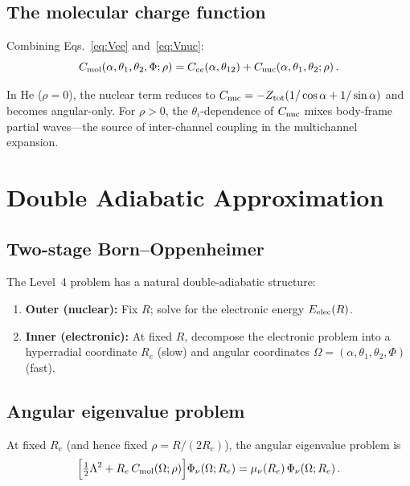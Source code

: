 \documentclass[aps,pra,twocolumn,superscriptaddress,longbibliography]{revtex4-2}
\begin{document}
\subsection{The molecular charge function}

Combining Eqs.~\eqref{eq:Vee} and~\eqref{eq:Vnuc}:
\begin{equation}
  C_{\rm mol}(\alpha,\theta_1,\theta_2,\Phi;\rho)
    = C_{ee}(\alpha,\theta_{12})
    + C_{\rm nuc}(\alpha,\theta_1,\theta_2;\rho)\,.
  \label{eq:Cmol}
\end{equation}

In He ($\rho=0$), the nuclear term reduces to
$C_{\rm nuc} = -Z_{\rm tot}(1/\cos\alpha + 1/\sin\alpha)$
and becomes angular-only.  For $\rho > 0$, the $\theta_i$-dependence
of $C_{\rm nuc}$ mixes body-frame partial waves---the source of
inter-channel coupling in the multichannel expansion.

\section{Double Adiabatic Approximation}
\label{sec:adiabatic}

\subsection{Two-stage Born--Oppenheimer}

The Level~4 problem has a natural double-adiabatic structure:
\begin{enumerate}
  \item \textbf{Outer (nuclear):} Fix $R$; solve for the electronic
    energy $E_{\rm elec}(R)$.
  \item \textbf{Inner (electronic):} At fixed $R$, decompose the
    electronic problem into a hyperradial coordinate $R_e$ (slow) and
    angular coordinates $\Omega = (\alpha,\theta_1,\theta_2,\Phi)$ (fast).
\end{enumerate}

\subsection{Angular eigenvalue problem}

At fixed $R_e$ (and hence fixed $\rho = R/(2R_e)$), the angular
eigenvalue problem is
\begin{equation}
  \Bigl[\tfrac{1}{2}\Lambda^2
    + R_e\,C_{\rm mol}(\Omega;\rho)\Bigr]
  \Phi_\nu(\Omega;R_e)
  = \mu_\nu(R_e)\,\Phi_\nu(\Omega;R_e)\,.
  \label{eq:angular}
\end{equation}
\end{document}

